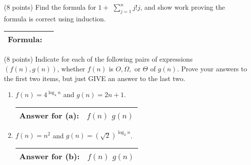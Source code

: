 \documentclass[11pt]{article}
\begin{document}
\begin{problems}
\newpage
 \item (8 points) Find the formula for $1+$ $\displaystyle\sum_{j=1}^n j!j $,
and show work proving the formula is correct using induction.
\begin{table}[!h] \flushright \renewcommand{\arraystretch}{2}  \begin{tabular}{|l|c| } \hline
Formula: & \hspace{2in} \\
\hline \end{tabular} \end{table}
\vspace{1.75in}


\item (8 points) Indicate for each of the following pairs of expressions $(f(n),g(n))$,
whether $f(n)$ is  $O, \Omega,$ or $\Theta$ of $g(n)$.  Prove your answers to the first two items, but just GIVE an answer to the last two.
\begin{enumerate}
\item $f(n)=4^{\log_{4} n}$ and $g(n)=2n+1$.
\vspace{1in}
\begin{table}[!h]  \flushright \renewcommand{\arraystretch}{2}  \begin{tabular}{|l|c| } \hline
Answer for (a): &  \hspace{.15in} $f(n)$ \hspace{.5in} $g(n)$ \hspace{.15in}\\
\hline \end{tabular} \end{table}

\item $f(n)= n^2$ and $g(n)=(\sqrt{2})^{\log_2 n}$.
\vspace{1in}
\begin{table}[!h]  \flushright \renewcommand{\arraystretch}{2}  \begin{tabular}{|l|c| } \hline
Answer for (b): & \hspace{.15in} $f(n)$ \hspace{.5in} $g(n)$ \hspace{.15in}\\
\hline \end{tabular} \end{table}


\end{enumerate}
\end{problems}
\end{document}
